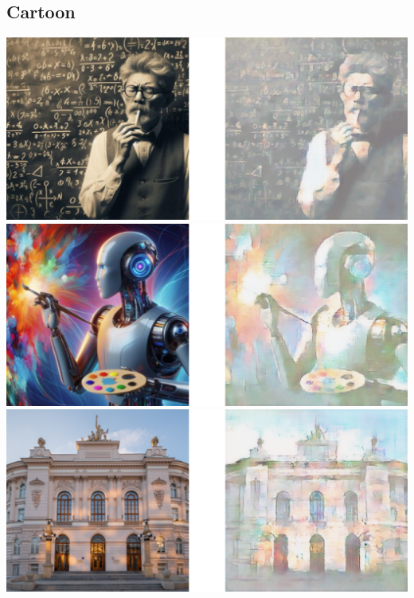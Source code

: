 \documentclass{article}
\begin{document}
\subsection{Cartoon}
\includegraphics[width=\textwidth]{../imgs/side_by_side/c1.png}
\vspace{3mm} \\
\includegraphics[width=\textwidth]{../imgs/side_by_side/c2.png}
\vspace{3mm} \\
\includegraphics[width=\textwidth]{../imgs/side_by_side/c3.png}
\end{document}
